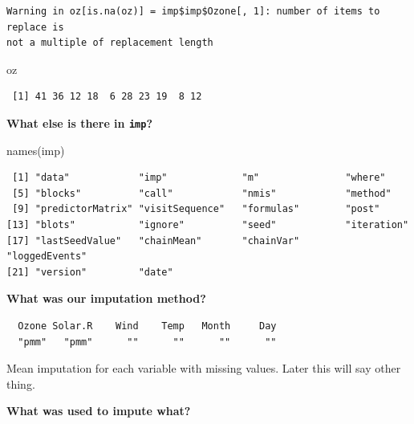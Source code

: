 \documentclass[
  letterpaper,
  DIV=11,
  numbers=noendperiod]{scrreprt}
\newenvironment{Shaded}{\begin{snugshade}}{\end{snugshade}}
\newcommand{\FunctionTok}[1]{\textcolor[rgb]{0.02,0.16,0.49}{#1}}
\newcommand{\NormalTok}[1]{\textcolor[rgb]{0.00,0.44,0.13}{#1}}
\newcommand{\SpecialCharTok}[1]{\textcolor[rgb]{0.25,0.44,0.63}{#1}}
\begin{document}
\begin{verbatim}
Warning in oz[is.na(oz)] = imp$imp$Ozone[, 1]: number of items to replace is
not a multiple of replacement length
\end{verbatim}

\begin{Shaded}
\begin{Highlighting}[]
\NormalTok{  oz}
\end{Highlighting}
\end{Shaded}

\begin{verbatim}
 [1] 41 36 12 18  6 28 23 19  8 12
\end{verbatim}

\textbf{What else is there in \texttt{imp}?}

\begin{Shaded}
\begin{Highlighting}[]
  \FunctionTok{names}\NormalTok{(imp)}
\end{Highlighting}
\end{Shaded}

\begin{verbatim}
 [1] "data"            "imp"             "m"               "where"          
 [5] "blocks"          "call"            "nmis"            "method"         
 [9] "predictorMatrix" "visitSequence"   "formulas"        "post"           
[13] "blots"           "ignore"          "seed"            "iteration"      
[17] "lastSeedValue"   "chainMean"       "chainVar"        "loggedEvents"   
[21] "version"         "date"           
\end{verbatim}

\textbf{What was our imputation method?}

\begin{Shaded}
\end{Shaded}

\begin{verbatim}
  Ozone Solar.R    Wind    Temp   Month     Day 
  "pmm"   "pmm"      ""      ""      ""      "" 
\end{verbatim}

Mean imputation for each variable with missing values. Later this will
say other thing.

\textbf{What was used to impute what?}

\begin{Shaded}
\end{Shaded}
\end{document}
